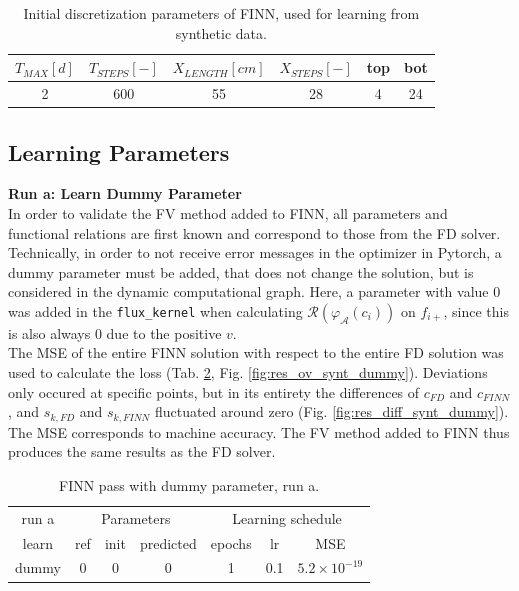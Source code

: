 \begin{table}[h!]
    \centering
\begin{tabular}{cccccc}
      $T_{MAX} \left[d\right]$ & $T_{STEPS} \left[-\right]$ & $X_{LENGTH} \left[cm\right]$ & $X_{STEPS} \left[-\right]$ & top & bot \\ [0.2 cm] \hline
      2 & 600 & 55 & 28 & 4 & 24
\end{tabular}
    \caption[Initial discretization parameters of FINN, learning from synthetic data]{Initial discretization parameters of FINN, used for learning from synthetic data.}
    \label{tab:disc_pams}
\end{table}
\FloatBarrier
\subsection{Learning Parameters}
\textbf{Run a: Learn Dummy Parameter}\\
In order to validate the FV method added to FINN, all parameters and functional relations are first known and correspond to those from the FD solver. Technically, in order to not receive error messages in the optimizer in Pytorch, a dummy parameter must be added, that does not change the solution, but is considered in the dynamic computational graph. Here, a parameter with value 0 was added in the \texttt{flux\_kernel} when calculating $\mathcal{R}(\varphi_{\mathcal{A}}(c_i))$ on $f_{i+}$, since this is also always 0 due to the positive $v$.\\
The MSE of the entire FINN solution with respect to the entire FD solution was used to calculate the loss (Tab. \ref{table:dummy}, Fig.  \ref{fig:res_ov_synt_dummy}). Deviations only occured at specific points, but in its entirety the differences of $c_{FD}$ and $c_{FINN}$, and $s_{k, FD}$ and $s_{k, FINN}$ fluctuated around zero (Fig. \ref{fig:res_diff_synt_dummy}). The MSE corresponds to machine accuracy. The FV method added to FINN thus produces the same results as the FD solver.
\begin{table}[]
    \centering
    \begin{tabular}{c|ccc|cc|c}
    run a & \multicolumn{3}{c}{Parameters}& \multicolumn{3}{c}{Learning schedule}\\
          learn & ref & init & predicted & epochs & lr & MSE \\[0.2 cm] \hline
         dummy & 0 & 0 & 0 & 1 & 0.1 & $5.2 \times 10^{-19}$\\
    \end{tabular}
    \caption{FINN pass with dummy parameter, run a.}
    \label{table:dummy}
\end{table}
